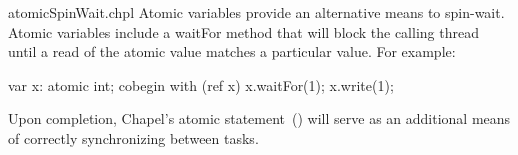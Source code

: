 \begin{chapelexample}{atomicSpinWait.chpl}
Atomic variables provide an alternative means to spin-wait. Atomic variables include a waitFor method that will block the calling thread until a read of the atomic value matches a particular value. For example:

\begin{chapel}
var x: atomic int;
cobegin with (ref x) {
  x.waitFor(1);
  x.write(1);
}
\end{chapel}
\begin{chapeloutput}
\end{chapeloutput}

\end{chapelexample}


\begin{future}
Upon completion, Chapel's atomic statement~() will serve as
an additional means of correctly synchronizing between tasks.
\end{future}

